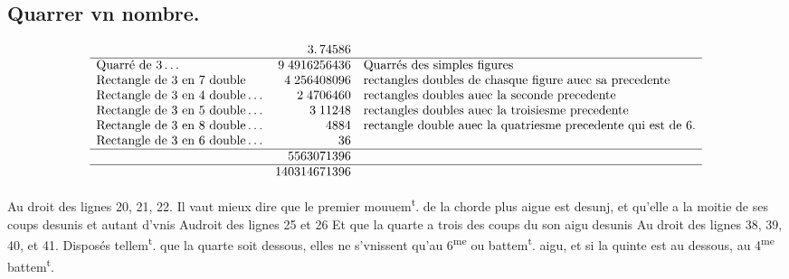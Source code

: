 \documentclass[11pt,a4paper]{article}
\begin{document}

\subsection*{Quarrer vn nombre.}

\[
\begin{array}{lrl}
 & 3.\,74586 & \\ \hline
\text{Quarré de 3} \ldots & 9\;4916256436 & \text{Quarrés des simples figures} \\
\text{Rectangle de 3 en 7 double} & 4\;256408096 & \text{rectangles doubles de chasque figure auec sa precedente} \\
\text{Rectangle de 3 en 4 double} \ldots & 2\;4706460 & \text{rectangles doubles auec la seconde precedente} \\
\text{Rectangle de 3 en 5 double} \ldots & 3\;11248 & \text{rectangles doubles auec la troisiesme precedente} \\
\text{Rectangle de 3 en 8 double} \ldots & 4884 & \text{rectangle double auec la quatriesme precedente qui est de 6.} \\
\text{Rectangle de 3 en 6 double} \ldots & 36 & \\ \hline
 & 5563071396 & \\ \hline
 & 140314671396 &
\end{array}
\]


Au droit des  lignes 20, 21, 22.
Il vaut mieux dire que le premier mouuem\textsuperscript{t}. de la chorde plus aigue est desunj, et qu'elle a la moitie de ses coups desunis et autant d'vnis
Audroit des lignes 25 et 26
Et que la quarte a trois des coups du son aigu desunis
Au droit des lignes 38, 39, 40, et 41.
Disposés tellem\textsuperscript{t}. que la quarte soit dessous, elles ne s'vnissent qu'au 6\textsuperscript{me}  ou battem\textsuperscript{t}. aigu, et si la quinte est au dessous, au 4\textsuperscript{me} battem\textsuperscript{t}.
\end{document}

